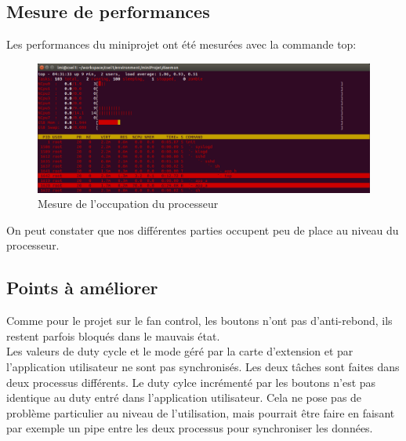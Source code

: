 \subsection{Mesure de performances}
Les performances du miniprojet ont été mesurées avec la commande top:
\begin{figure}[H]
	\begin{center}
		\includegraphics[width=16.5cm]{img/top3.png}
		\caption{Mesure de l'occupation du processeur}
		\label{top3}
	\end{center}
\end{figure}
On peut constater que nos différentes parties occupent peu de place au niveau du processeur.

\subsection{Points à améliorer}
Comme pour le projet sur le fan control, les boutons n'ont pas d'anti-rebond, ils restent parfois bloqués dans le mauvais état.\\
Les valeurs de duty cycle et le mode géré par la carte d'extension et par l'application utilisateur ne sont pas synchronisés. Les deux tâches sont faites dans deux processus différents. Le duty cylce incrémenté par les boutons n'est pas identique au duty entré dans l'application utilisateur. Cela ne pose pas de problème particulier au niveau de l'utilisation, mais pourrait être faire en faisant par exemple un pipe entre les deux processus pour synchroniser les données.\\
